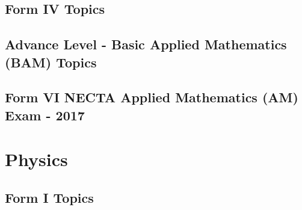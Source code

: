 \documentclass[pdftex,10pt,a4paper,twoside]{report}
\begin{document}
\section{Form IV Topics}









\section{Advance Level - Basic Applied Mathematics (BAM) Topics}












%

\section{Form VI NECTA Applied Mathematics (AM) Exam - 2017}

\chapter{Physics}


\vspace*{-10mm}
\section{Form I Topics}
%








\end{document}
